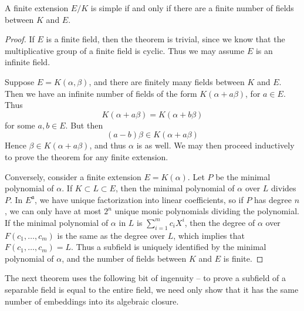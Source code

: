 \begin{theorem}
    A finite extension $E/K$ is simple if and only if there are a finite number of fields between $K$ and $E$.
\end{theorem}
\begin{proof}
    If $E$ is a finite field, then the theorem is trivial, since we know that the multiplicative group of a finite field is cyclic. Thus we may assume $E$ is an infinite field.

    Suppose $E = K(\alpha, \beta)$, and there are finitely many fields between $K$ and $E$. Then we have an infinite number of fields of the form $K(\alpha + a \beta)$, for $a \in E$. Thus
    \[ K(\alpha + a \beta) = K(\alpha + b \beta) \]
    for some $a,b \in E$. But then
    \[ (a - b) \beta \in K(\alpha + a \beta) \]
    Hence $\beta \in K(\alpha + a \beta)$, and thus $\alpha$ is as well. We may then proceed inductively to prove the theorem for any finite extension.

    Conversely, consider a finite extension $E = K(\alpha)$. Let $P$ be the minimal polynomial of $\alpha$. If $K \subset L \subset E$, then the minimal polynomial of $\alpha$ over $L$ divides $P$. In $E^{\mathfrak{a}}$, we have unique factorization into linear coefficients, so if $P$ has degree $n$, we can only have at most $2^n$ unique monic polynomials dividing the polynomial. If the minimal polynomial of $\alpha$ in $L$ is $\sum_{i = 1}^m c_i X^i$, then the degree of $\alpha$ over $F(c_1, \dots, c_m)$ is the same as the degree over $L$, which implies that $F(c_1, \dots, c_m) = L$. Thus a subfield is uniquely identified by the minimal polynomial of $\alpha$, and the number of fields between $K$ and $E$ is finite.
\end{proof}

The next theorem uses the following bit of ingenuity -- to prove a subfield of a separable field is equal to the entire field, we need only show that it has the same number of embeddings into its algebraic closure.

